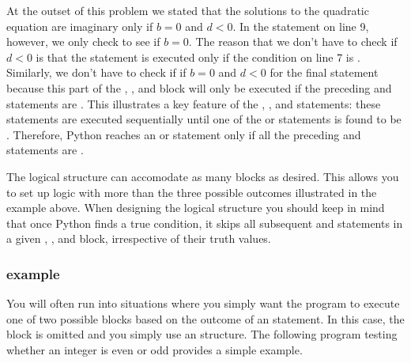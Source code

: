 \documentclass[letterpaper,10pt,english]{sphinxmanual}
\begin{document}
\sphinxAtStartPar
At the outset of this problem we stated that the solutions to the quadratic equation are imaginary only if \(b=0\) and \(d < 0\).  In the  statement on line 9, however, we only check to see if  \(b=0\).  The reason that we don’t have to check if \(d < 0\) is that the  statement is executed only if the condition  on line 7 is .  Similarly, we don’t have to check if if \(b=0\) and \(d < 0\) for the final  statement because this part of the , , and  block will only be executed if the preceding  and  statements are .  This illustrates a key feature of the , , and  statements: these statements are executed sequentially until one of the  or  statements is found to be .  Therefore, Python reaches an  or  statement only if all the preceding  and  statements are .

\sphinxAtStartPar
The \sphinxhyphen{}\sphinxhyphen{} logical structure can accomodate as many  blocks as desired.  This allows you to set up logic with more than the three possible outcomes illustrated in the example above.  When designing the logical structure you should keep in mind that once Python finds a true condition, it skips all subsequent  and  statements in a given , , and  block, irrespective of their truth values.


\subsubsection{\sphinxhyphen{} example}
\label{\detokenize{chap6/chap6_loopsconds:if-else-example}}
\sphinxAtStartPar
You will often run into situations where you simply want the program to execute one of two possible blocks based on the outcome of an  statement.  In this case, the  block is omitted and you simply use an \sphinxhyphen{} structure.  The following program testing whether an integer is even or odd provides a simple example.
\end{document}
